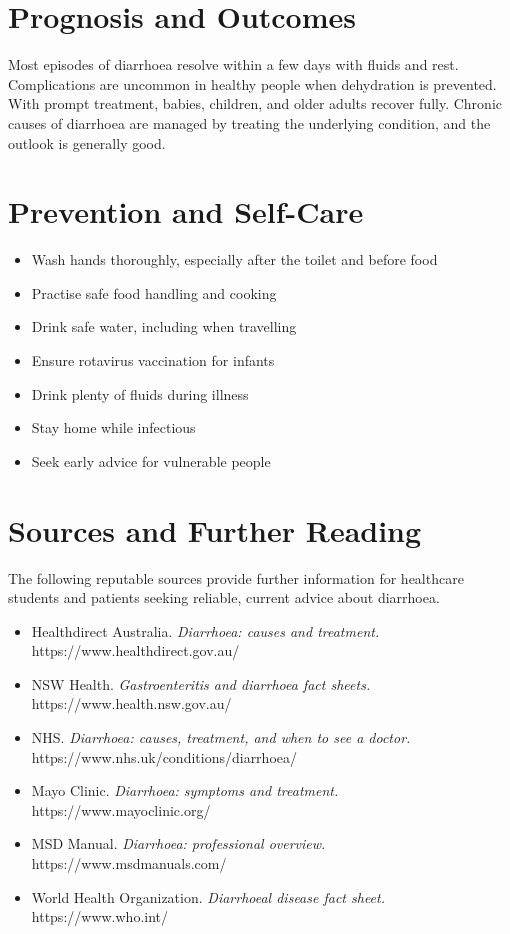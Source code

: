 \section*{Prognosis and Outcomes}
Most episodes of diarrhoea resolve within a few days with fluids and rest. Complications are uncommon in healthy people when dehydration is prevented. With prompt treatment, babies, children, and older adults recover fully. Chronic causes of diarrhoea are managed by treating the underlying condition, and the outlook is generally good.

\section*{Prevention and Self-Care}
\begin{itemize}
    \item Wash hands thoroughly, especially after the toilet and before food
    \item Practise safe food handling and cooking
    \item Drink safe water, including when travelling
    \item Ensure rotavirus vaccination for infants
    \item Drink plenty of fluids during illness
    \item Stay home while infectious
    \item Seek early advice for vulnerable people
\end{itemize}

\section*{Sources and Further Reading}
The following reputable sources provide further information for healthcare students and patients seeking reliable, current advice about diarrhoea.

\begin{itemize}
    \item Healthdirect Australia. \textit{Diarrhoea: causes and treatment.} https://www.healthdirect.gov.au/
    \item NSW Health. \textit{Gastroenteritis and diarrhoea fact sheets.} https://www.health.nsw.gov.au/
    \item NHS. \textit{Diarrhoea: causes, treatment, and when to see a doctor.} https://www.nhs.uk/conditions/diarrhoea/
    \item Mayo Clinic. \textit{Diarrhoea: symptoms and treatment.} https://www.mayoclinic.org/
    \item MSD Manual. \textit{Diarrhoea: professional overview.} https://www.msdmanuals.com/
    \item World Health Organization. \textit{Diarrhoeal disease fact sheet.} https://www.who.int/
\end{itemize}
